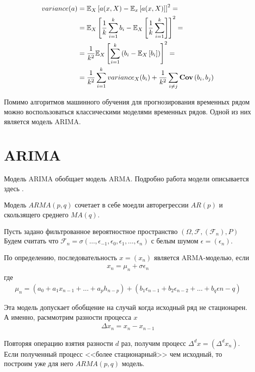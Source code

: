 \begin{align}
	variance(a) & = \mathbb{E}_X\left[a(x, X) - \mathbb{E}_x\left[a(x, X)\right]\right]^2 = \\
	& = \mathbb{E}_X\left[\frac{1}{k} \sum_{i=1}^{k} b_i - \mathbb{E}_X\left[\frac{1}{k} \sum_{i=1}^{k}\right]\right]^2 = \\
	& = \frac{1}{k^2} \mathbb{E}_X\left[\sum_{i=1}^{k} \left( b_i - \mathbb{E}_X\left[b_i \right]\right)\right]^2 = \\
	& = \frac{1}{k^2} \sum_{i=1}^{k} variance_X(b_i) + 
	\frac{1}{k^2} \sum_{i \ne j} \textbf{Cov}\left(b_i, b_j\right)
\end{align}

Помимо алгоритмов машинного обучения для прогнозирования временных рядом можно воспользоваться классическими моделями временных рядов.
Одной из них является модель ARIMA.

\section{ARIMA}
\label{sec:ARIMA}

Модель ARIMA обобщает модель ARMA. Подробно работа модели описывается здесь \cite{shiryaev_finmat_1}.

Модель $ARMA(p, q)$ сочетает в себе моедли авторегрессии $AR(p)$ и скользящего среднего $MA(q)$.

Пусть задано фильтрованное вероятностное пространство $\left( \Omega, \mathscr{F}, (\mathscr{F}_n), P \right)$
Будем считать что $\mathscr{F}_n = \sigma(\dots, \epsilon_{-1}, \epsilon_0, \epsilon_1, \dots, \epsilon_n)$ с белым шумом $\epsilon = (\epsilon_n)$.

По определению, последовательность $x = (x_n)$ является ARMA-моделью, если 
\begin{align}
	x_n = \mu_n + \sigma \epsilon_n
\end{align}
где
\begin{align}
	\mu_n = \left(a_0 + a_1 x_{n-1} + \dots + a_p h_{n-p} \right) +
	\left(b_1 \epsilon_{n-1} + b_2 \epsilon_{n-2} + \dots + b_q \epsilon{n - q} \right)
\end{align}

Эта модель допускает обобщение на случай когда исходный ряд не стационарен. А именно, расммотрим разности процесса $x$
\begin{align}
	\Delta x_n = x_n - x_{n-1}
\end{align}

Повторяя операцию взятия разности $d$ раз, получим процесс $\Delta^d x = (\Delta^d x_n)$. Если полученный процесс <<более стационарный>>
чем исходный, то построим уже для него $ARMA(p, q)$ модель.

